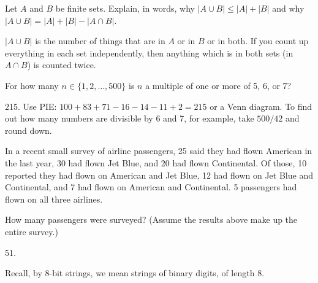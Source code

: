 \begin{questions}
\begin{answer}
	\end{answer}
	
	
	
\question Let $A$ and $B$ be finite sets.  Explain, in words, why $|A \cup B| \le |A| + |B|$ and why $|A \cup B| = |A| + |B| - |A \cap B|$.

	\begin{answer}
		$|A \cup B|$ is the number of things that are in $A$ or in $B$ or in both.  If you count up everything in each set independently, then anything which is in both sets (in $A \cap B$) is counted twice.
	\end{answer}
	
	
	
\question For how many $n \in \{1,2, \ldots, 500\}$ is $n$ a multiple of one or more of 5, 6, or 7?

	\begin{answer}
		215.  Use PIE: $100 + 83 + 71 - 16 - 14 -11 + 2 = 215$ or a Venn diagram.  To find out how many numbers are divisible by 6 and 7, for example, take $500/42$ and round down.
	\end{answer}
	
	


\question In a recent small survey of airline passengers, 25 said they had flown American in the last year, 30 had flown Jet Blue, and 20 had flown Continental.  Of those, 10 reported they had flown on American and Jet Blue, 12 had flown on Jet Blue and Continental, and 7 had flown on American and Continental.  5 passengers had flown on all three airlines. 

How many passengers were surveyed?  (Assume the results above make up the entire survey.)

	\begin{answer}
		51.
	\end{answer}
	
	


	

\question Recall, by $8$-bit strings, we mean strings of binary digits, of length 8.
\begin{parts}

\end{parts}
\end{questions}
